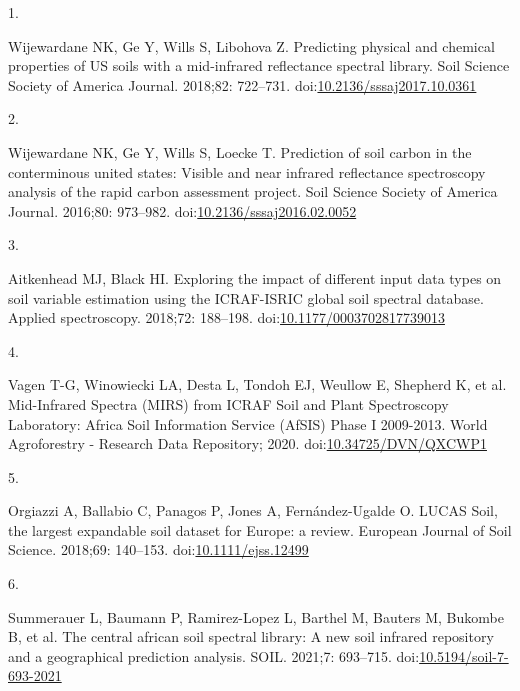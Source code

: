 \documentclass[
  letterpaper,
  DIV=11,
  numbers=noendperiod]{scrreprt}
\newlength{\cslhangindent}
\newlength{\csllabelwidth}
\newenvironment{CSLReferences}[2] %
 {\begin{list}{}{%
  \setlength{\itemindent}{0pt}
  \setlength{\leftmargin}{0pt}
  \setlength{\parsep}{0pt}
  \ifodd #1
   \setlength{\leftmargin}{\cslhangindent}
   \setlength{\itemindent}{-1\cslhangindent}
  \fi
  \setlength{\itemsep}{#2\baselineskip}}}
 {\end{list}}
\newcommand{\CSLLeftMargin}[1]{\parbox[t]{\csllabelwidth}{\strut#1\strut}}
\newcommand{\CSLRightInline}[1]{\parbox[t]{\linewidth - \csllabelwidth}{\strut#1\strut}}
\begin{document}
\label{refs}
\begin{CSLReferences}{0}{1}
\CSLLeftMargin{1. }%
\CSLRightInline{Wijewardane NK, Ge Y, Wills S, Libohova Z. {Predicting
physical and chemical properties of US soils with a mid-infrared
reflectance spectral library}. Soil Science Society of America Journal.
2018;82: 722--731.
doi:\href{https://doi.org/10.2136/sssaj2017.10.0361}{10.2136/sssaj2017.10.0361}}

\CSLLeftMargin{2. }%
\CSLRightInline{Wijewardane NK, Ge Y, Wills S, Loecke T. Prediction of
soil carbon in the conterminous united states: Visible and near infrared
reflectance spectroscopy analysis of the rapid carbon assessment
project. Soil Science Society of America Journal. 2016;80: 973--982.
doi:\href{https://doi.org/10.2136/sssaj2016.02.0052}{10.2136/sssaj2016.02.0052}}

\CSLLeftMargin{3. }%
\CSLRightInline{Aitkenhead MJ, Black HI. {Exploring the impact of
different input data types on soil variable estimation using the
ICRAF-ISRIC global soil spectral database}. Applied spectroscopy.
2018;72: 188--198.
doi:\href{https://doi.org/10.1177/0003702817739013}{10.1177/0003702817739013}}

\CSLLeftMargin{4. }%
\CSLRightInline{Vagen T-G, Winowiecki LA, Desta L, Tondoh EJ, Weullow E,
Shepherd K, et al. {Mid-Infrared Spectra (MIRS) from ICRAF Soil and
Plant Spectroscopy Laboratory: Africa Soil Information Service (AfSIS)
Phase I 2009-2013}. World Agroforestry - Research Data Repository; 2020.
doi:\href{https://doi.org/10.34725/DVN/QXCWP1}{10.34725/DVN/QXCWP1}}

\CSLLeftMargin{5. }%
\CSLRightInline{Orgiazzi A, Ballabio C, Panagos P, Jones A,
Fernández-Ugalde O. {LUCAS Soil, the largest expandable soil dataset for
Europe: a review}. European Journal of Soil Science. 2018;69: 140--153.
doi:\href{https://doi.org/10.1111/ejss.12499}{10.1111/ejss.12499}}

\CSLLeftMargin{6. }%
\CSLRightInline{Summerauer L, Baumann P, Ramirez-Lopez L, Barthel M,
Bauters M, Bukombe B, et al. The central african soil spectral library:
A new soil infrared repository and a geographical prediction analysis.
SOIL. 2021;7: 693--715.
doi:\href{https://doi.org/10.5194/soil-7-693-2021}{10.5194/soil-7-693-2021}}


\end{CSLReferences}
\end{document}
